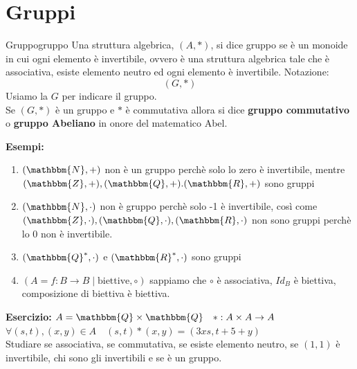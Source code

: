 \documentclass[12pt, letterpaper]{report}
\newcounter{definition}
\newcommand{\nmu}{}
\begin{document}
	\chapter{Gruppi}
		\begin{definition}{\nmu Gruppo}{gruppo}
			Una struttura algebrica, $(A,*)$, si dice gruppo se è un monoide in cui ogni elemento è invertibile, ovvero è una struttura algebrica tale che è associativa, esiste elemento neutro ed ogni elemento è invertibile.
			Notazione:
			\[(G, *)\]
			Usiamo la $G$ per indicare il gruppo. \\
			Se $(G, *)$ è un gruppo e $*$ è commutativa allora si dice \textbf{gruppo commutativo} o \textbf{gruppo Abeliano} in onore del matematico Abel.
		\end{definition}
		\textbf{Esempi:}
		\begin{enumerate}
			\item $(\mathbbm{N}, +)$ non è un gruppo perchè solo lo zero è invertibile, mentre $(\mathbbm{Z}, +), (\mathbbm{Q}, +). (\mathbbm{R}, +)$ sono gruppi
			\item $(\mathbbm{N}, \cdot)$ non è gruppo perchè solo -1 è invertibile, così come $(\mathbbm{Z},\cdot), (\mathbbm{Q}, \cdot), (\mathbbm{R}, \cdot)$ non sono gruppi perchè lo 0 non è invertibile.
			\item $(\mathbbm{Q}^*,\cdot)$ e $(\mathbbm{R}^*, \cdot)$ sono gruppi
			\item $(A = {f: B \to B \mid \text{biettive}}, \circ)$ sappiamo che $\circ$ è associativa, $Id_B$ è biettiva, composizione di biettiva è biettiva.
		\end{enumerate}
		\textbf{Esercizio:} $A = \mathbbm{Q} \times \mathbbm{Q} \quad *: A \times A \to A$ \\
		$\forall (s,t), (x,y) \in A \quad (s,t)*(x,y) = (3xs, t + 5+ y)$ \\
		Studiare se associativa, se commutativa, se esiste elemento neutro, se $(1,1)$ è invertibile, chi sono gli invertibili e se è un gruppo. \\
\end{document}

